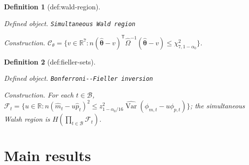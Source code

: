 \documentclass{article}
\newtheorem{definition}{Definition}
\begin{document}
\begin{definition}[def:wald-region]\label{def:wald-region}
\par\smallskip\noindent\emph{Defined object.} \texttt{Simultaneous Wald region}
\par\smallskip\noindent\emph{Construction.} \(\mathcal C_{\theta}=\{v\in\mathbb R^7:n(\widehat{\boldsymbol\theta}-v)^{\mathsf T}\widehat\Omega^{-1}(\widehat{\boldsymbol\theta}-v)\le\chi^2_{7,1-\alpha_0}\}\).
\end{definition}

\begin{definition}[def:fieller-sets]\label{def:fieller-sets}
\par\smallskip\noindent\emph{Defined object.} \texttt{Bonferroni-\allowbreak{}-\allowbreak{}Fieller inversion}
\par\smallskip\noindent\emph{Construction.} For each \(t\in\mathcal B\), \(\mathcal F_t=\{u\in\mathbb R:n(\widehat m_t-u\widehat p_t)^2\le z_{1-\alpha_0/16}^2\widehat{\operatorname{Var}}(\phi_{m,t}-u\phi_{p,t})\}\); the simultaneous Walsh region is \(H(\prod_{t\in\mathcal B}\mathcal F_t)\).
\end{definition}

\section{Main results}
\end{document}
